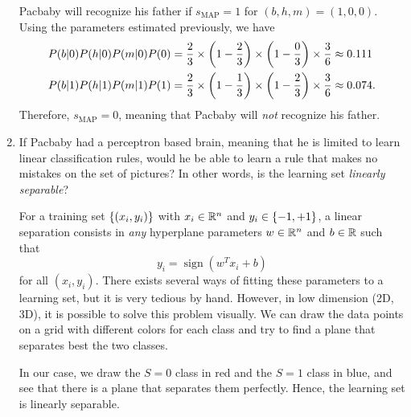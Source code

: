 \documentclass[11pt, a4paper]{article}
\begin{document}
\begin{enumerate}
    \begin{solution}
        Pacbaby will recognize his father if $s_{\text{MAP}} = 1$ for $(b, h, m) = (1, 0, 0)$. Using the parameters estimated previously, we have
        \begin{align*}
            P(b \knowing 0) P(h \knowing 0) P(m \knowing 0) P(0) & = \frac{2}{3} \times \rbk*{1 - \frac{2}{3}} \times \rbk*{1 - \frac{0}{3}} \times \frac{3}{6} \approx \num{0.111} \\
            P(b \knowing 1) P(h \knowing 1) P(m \knowing 1) P(1) & = \frac{2}{3} \times \rbk*{1 - \frac{1}{3}} \times \rbk*{1 - \frac{2}{3}} \times \frac{3}{6} \approx \num{0.074} .
        \end{align*}
        Therefore, $s_{\text{MAP}} = 0$, meaning that Pacbaby will \emph{not} recognize his father.
    \end{solution}

    \item If Pacbaby had a perceptron based brain, meaning that he is limited to learn linear classification rules, would he be able to learn a rule that makes no mistakes on the set of pictures? In other words, is the learning set \emph{linearly separable}?

    \begin{solution}
        For a training set $\cbk{(x_i, y_i)}$ with $x_i \in \R^n$ and $y_i \in \cbk{-1, +1}$, a linear separation consists in \emph{any} hyperplane parameters $w \in \R^n$ and $b \in \R$ such that
        \begin{equation*}
            y_i = \operatorname{sign}(w^T x_i + b)
        \end{equation*}
        for all $(x_i, y_i)$. There exists several ways of fitting these parameters to a learning set, but it is very tedious by hand. However, in low dimension (2D, 3D), it is possible to solve this problem visually. We can draw the data points on a grid with different colors for each class and try to find a plane that separates best the two classes.

        In our case, we draw the $S = 0$ class in red and the $S = 1$ class in blue, and see that there is a plane that separates them perfectly. Hence, the learning set is linearly separable.

        \begin{figure}[h]
            \centering


\end{figure}
\end{solution}
\end{enumerate}
\end{document}
